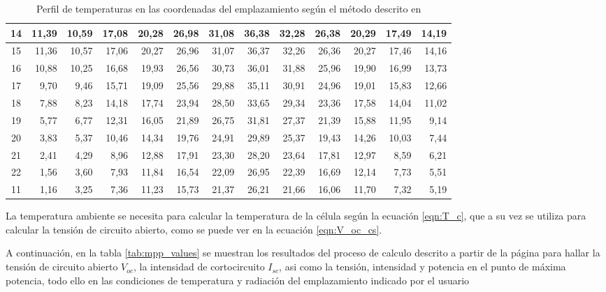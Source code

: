 \begin{table}[ht]
\begin{tabular}{|c|r|r|r|r|r|r|r|r|r|r|r|r|}
14 & 11,39 & 10,59 & 17,08 & 20,28 & 26,98 & 31,08 & 36,38 & 32,28 & 26,38 & 20,29 & 17,49 & 14,19 \\ \hline
15 & 11,36 & 10,57 & 17,06 & 20,27 & 26,96 & 31,07 & 36,37 & 32,26 & 26,36 & 20,27 & 17,46 & 14,16 \\ \hline
16 & 10,88 & 10,25 & 16,68 & 19,93 & 26,56 & 30,73 & 36,01 & 31,88 & 25,96 & 19,90 & 16,99 & 13,73 \\ \hline
17 & 9,70  & 9,46  & 15,71 & 19,09 & 25,56 & 29,88 & 35,11 & 30,91 & 24,96 & 19,01 & 15,83 & 12,66 \\ \hline
18 & 7,88  & 8,23  & 14,18 & 17,74 & 23,94 & 28,50 & 33,65 & 29,34 & 23,36 & 17,58 & 14,04 & 11,02 \\ \hline
19 & 5,77  & 6,77  & 12,31 & 16,05 & 21,89 & 26,75 & 31,81 & 27,37 & 21,39 & 15,88 & 11,95 & 9,14  \\ \hline
20 & 3,83  & 5,37  & 10,46 & 14,34 & 19,76 & 24,91 & 29,89 & 25,37 & 19,43 & 14,26 & 10,03 & 7,44  \\ \hline
21 & 2,41  & 4,29  & 8,96  & 12,88 & 17,91 & 23,30 & 28,20 & 23,64 & 17,81 & 12,97 & 8,59  & 6,21  \\ \hline
22 & 1,56  & 3,60  & 7,93  & 11,84 & 16,54 & 22,09 & 26,95 & 22,39 & 16,69 & 12,14 & 7,73  & 5,51  \\ \hline
11 & 1,16  & 3,25  & 7,36  & 11,23 & 15,73 & 21,37 & 26,21 & 21,66 & 16,06 & 11,70 & 7,32  & 5,19  \\ \hline
\end{tabular}
\caption{Perfil de temperaturas en las coordenadas del emplazamiento según el método descrito en \cite{temp_paper} \label{tab:temp_profiles}}
\end{table}

La temperatura ambiente se necesita para calcular la temperatura de la célula según la ecuación \ref{eqn:T_c}, que a su vez se utiliza para calcular la tensión de circuito abierto, como se puede ver en la ecuación \ref{eqn:V_oc_cs}.

A continuación, en la tabla \ref{tab:mpp_values} se muestran los resultados del proceso de calculo descrito a partir de la página \pageref{section:var_form_factor} para hallar la tensión de circuito abierto $V_{oc}$, la intensidad de cortocircuito $I_{sc}$, asi como la tensión, intensidad y potencia en el punto de máxima potencia, todo ello en las condiciones de temperatura y radiación del emplazamiento indicado por el usuario

